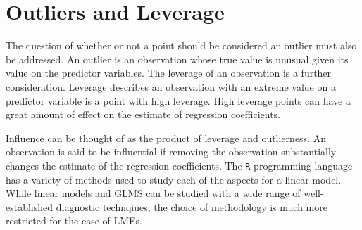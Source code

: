 \documentclass[12pt, a4paper]{report}
\theoremstyle{plain}
\theoremstyle{definition}
\theoremstyle{remark}
\begin{document}
%
%
%
%
















\section{Outliers and Leverage}



The question of whether or not a point should be considered an outlier must also be addressed. An outlier is an observation whose true value is unusual given its value on the predictor variables. The leverage of an observation is a further consideration. Leverage describes an observation with an extreme value on a predictor variable is a point with high leverage. High leverage points can have a great amount of effect on the estimate of regression coefficients.

Influence can be thought of as the product of leverage and outlierness. An observation is said to be influential if removing the observation substantially changes the estimate of the regression coefficients. The \texttt{R} programming language has a variety of methods used to study each of the aspects for a linear model. While linear models and GLMS can be studied with a wide range of well-established diagnostic technqiues, the choice of methodology is much more restricted for the case of LMEs.
\end{document}
